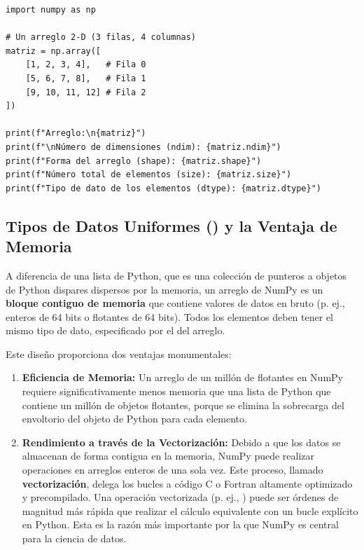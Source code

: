 \begin{example}
\text{ }\begin{verbatim}
import numpy as np

# Un arreglo 2-D (3 filas, 4 columnas)
matriz = np.array([
    [1, 2, 3, 4],   # Fila 0
    [5, 6, 7, 8],   # Fila 1
    [9, 10, 11, 12] # Fila 2
])

print(f"Arreglo:\n{matriz}")
print(f"\nNúmero de dimensiones (ndim): {matriz.ndim}")
print(f"Forma del arreglo (shape): {matriz.shape}")
print(f"Número total de elementos (size): {matriz.size}")
print(f"Tipo de dato de los elementos (dtype): {matriz.dtype}")
\end{verbatim}
\end{example}

\subsection{Tipos de Datos Uniformes () y la Ventaja de Memoria}
\label{subsec:numpy_dtypes}
A diferencia de una lista de Python, que es una colección de punteros a objetos de Python dispares dispersos por la memoria, un arreglo de NumPy es un \textbf{bloque contiguo de memoria} que contiene valores de datos en bruto (p. ej., enteros de 64 bits o flotantes de 64 bits). Todos los elementos deben tener el mismo tipo de dato, especificado por el  del arreglo.

Este diseño proporciona dos ventajas monumentales:
\begin{enumerate}
    \item \textbf{Eficiencia de Memoria:} Un arreglo de un millón de flotantes en NumPy requiere significativamente menos memoria que una lista de Python que contiene un millón de objetos flotantes, porque se elimina la sobrecarga del envoltorio del objeto de Python para cada elemento.
    \item \textbf{Rendimiento a través de la Vectorización:} Debido a que los datos se almacenan de forma contigua en la memoria, NumPy puede realizar operaciones en arreglos enteros de una sola vez. Este proceso, llamado \textbf{vectorización}, delega los bucles a código C o Fortran altamente optimizado y precompilado. Una operación vectorizada (p. ej., ) puede ser órdenes de magnitud más rápida que realizar el cálculo equivalente con un bucle  explícito en Python. Esta es la razón más importante por la que NumPy es central para la ciencia de datos.
\end{enumerate}

